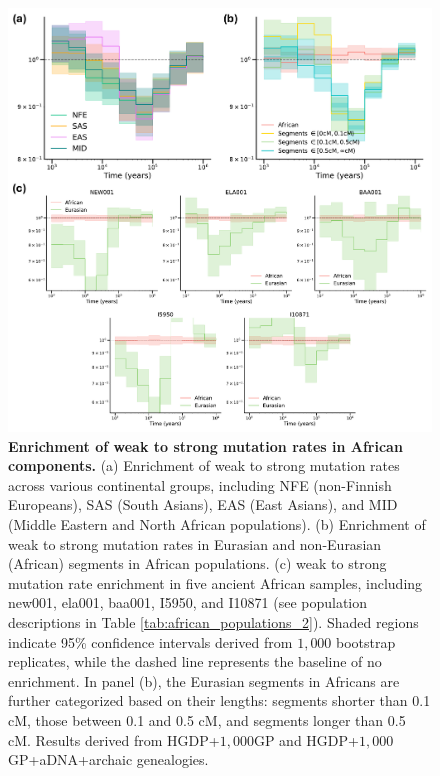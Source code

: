 \begin{figure}
    \centering
    \includegraphics[width=\linewidth]{figures/gb_bta/gb_bta_real_10.pdf}
    \captionsetup{width=\textwidth+3cm}
    \caption{
    \footnotesize
    \textbf{Enrichment of weak to strong mutation rates in African components.} (a) Enrichment of weak to strong mutation rates across various continental groups, including NFE (non-Finnish Europeans), SAS (South Asians), EAS (East Asians), and MID (Middle Eastern and North African populations). (b) Enrichment of weak to strong mutation rates in Eurasian and non-Eurasian (African) segments in African populations. (c) weak to strong mutation rate enrichment in five ancient African samples, including new001, ela001, baa001, I5950, and I10871 (see population descriptions in Table \ref{tab:african_populations_2}). Shaded regions indicate 95\% confidence intervals derived from $1{,}000$ bootstrap replicates, while the dashed line represents the baseline of no enrichment. In panel (b), the Eurasian segments in Africans are further categorized based on their lengths: segments shorter than 0.1 cM, those between 0.1 and 0.5 cM, and segments longer than 0.5 cM. Results derived from HGDP+$1{,}000$GP and HGDP+$1{,}000$GP+aDNA+archaic genealogies.
    }
\label{fig:gb-mut-ws}
\end{figure}


